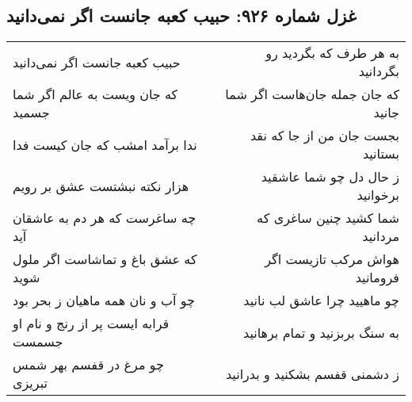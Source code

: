 \begin{center}
\section*{غزل شماره ۹۲۶: حبیب کعبه جانست اگر نمی‌دانید}
\label{sec:0926}
\begin{longtable}{l p{0.5cm} r}
حبیب کعبه جانست اگر نمی‌دانید
&&
به هر طرف که بگردید رو بگردانید
\\
که جان ویست به عالم اگر شما جسمید
&&
که جان جمله جان‌هاست اگر شما جانید
\\
ندا برآمد امشب که جان کیست فدا
&&
بجست جان من از جا که نقد بستانید
\\
هزار نکته نبشتست عشق بر رویم
&&
ز حال دل چو شما عاشقید برخوانید
\\
چه ساغرست که هر دم به عاشقان آید
&&
شما کشید چنین ساغری که مردانید
\\
که عشق باغ و تماشاست اگر ملول شوید
&&
هواش مرکب تازیست اگر فرومانید
\\
چو آب و نان همه ماهیان ز بحر بود
&&
چو ماهیید چرا عاشق لب نانید
\\
قرابه ایست پر از رنج و نام او جسمست
&&
به سنگ بربزنید و تمام برهانید
\\
چو مرغ در قفسم بهر شمس تبریزی
&&
ز دشمنی قفسم بشکنید و بدرانید
\\
\end{longtable}
\end{center}
